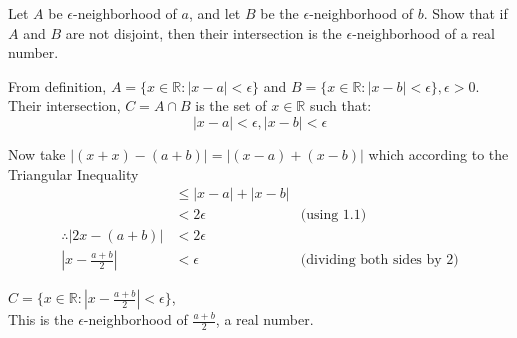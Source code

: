 \documentclass[boxes, qed]{homework}
\begin{document}
\newenvironment{amatrix}[1]{%
  \left[\begin{array}{@{}*{#1}{c}|c@{}}
}{%
  \end{array}\right]
}

\newenvironment{augmatrix}[1]{%
  \left[\begin{array}{#1}
}{%
  \end{array}\right]
}

\begin{problem}Let $A$ be $\epsilon$-neighborhood of $a$, and let $B$ be the 
  $\epsilon$-neighborhood of $b$. Show that if $A$ and $B$ are not disjoint, 
  then their intersection is the $\epsilon$-neighborhood of a real number.
\end{problem}
\begin{solution}From definition, $A=\{x\in{\mathbb{R}}:|x-a|<\epsilon\}$
  and $B=\{x\in{\mathbb{R}}:|x-b|<\epsilon\}, \epsilon > 0$. Their intersection,
  $C = A\cap{B}$ is the set of $x\in{\mathbb{R}}$ such that:
  \begin{equation}
    |x-a|<\epsilon, |x-b|<\epsilon
  \end{equation}
  
  Now take $|(x+x)-(a+b)| = |(x-a) + (x-b)|$
  which according to the Triangular Inequality
  \begin{align*}
    & \le |x-a| + |x-b| \\
    & < 2\epsilon 
      & \text{(using 1.1)}\\
    \therefore |2x-(a+b)| & < 2\epsilon\\
    |x-\frac{a+b}{2}| & < \epsilon 
      & \text{(dividing both sides by $2$)}
  \end{align*}
  
  $C = \{x\in\mathbb{R}: |x-\frac{a+b}{2}| < \epsilon \}$,\\

  This is the $\epsilon$-neighborhood of 
  $\frac{a+b}{2}$, a real number.
\end{solution}
\end{document}
